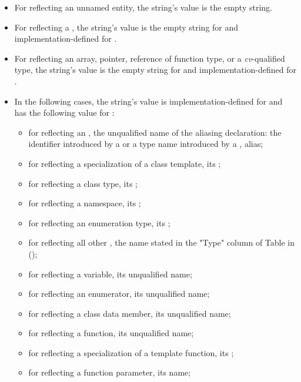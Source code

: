 \begin{std.txt}
\begin{itemdescr}
\begin{itemize}
\item For  reflecting an unnamed entity, the string's value is the empty string.
\item For  reflecting a , the string's value is the empty string for  and implementation-defined for .
\item For  reflecting an array, pointer, reference of function type, or a \emph{cv}-qualified type, the string's value is the empty string for  and implementation-defined for .
\item In the following cases, the string's value is implementation-defined for  and has the following value for :
\begin{itemize}
  \item for  reflecting an , the unqualified name of the aliasing declaration: the identifier introduced by a  or a type name introduced by a , alias;
  \item for  reflecting a specialization of a class template, its ;
  \item for  reflecting a class type, its ;
  \item for  reflecting a namespace, its ;
  \item for  reflecting an enumeration type, its ;
  \item for  reflecting all other , the name stated in the "Type" column of Table  in ();
  \item for  reflecting a variable, its unqualified name;
  \item for  reflecting an enumerator, its unqualified name;
  \item for  reflecting a class data member, its unqualified name;
  \item for  reflecting a function, its unqualified name;
  \item for  reflecting a specialization of a template function, its ;
  \item for  reflecting a function parameter, its name;

\end{itemize}
\end{itemize}
\end{itemdescr}
\end{std.txt}
